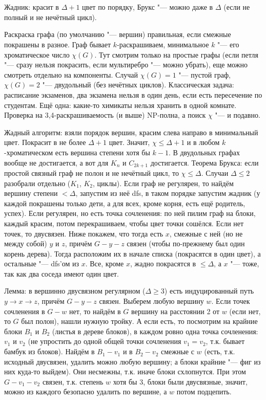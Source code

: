 \section{} %
	Жадник: красит в $\Delta+1$ цвет по порядку, Брукс "--- можно даже в $\Delta$ (если не полный и не нечётный цикл).

	Раскраска графа (по умолчанию "--- вершин) правильная, если смежные покрашены в разное.
	Граф бывает $k$-раскрашиваем, минимальное $k$ "--- его хроматическое число $\chi(G)$.
	Тут смотрим только на простые графы (если петля "--- сразу нельзя покрасить, если мультиребро "--- можно убрать),
	еще можно смотреть отдельно на компоненты.
	Случай $\chi(G)=1$ "--- пустой граф, $\chi(G)=2$ "--- двудольный (без нечётных циклов).
	Классическая задача: расписание экзаменов, два экзамена нельзя в один день, если есть пересечение по студентам.
	Ещё одна: какие-то химикаты нельзя хранить в одной комнате.
	Проверка на 3,4-раскрашиваемость (и выше) NP-полна, а поиск $\chi$ "--- и подавно.

	Жадный алгоритм: взяли порядок вершин, красим слева направо в минимальный цвет.
	Покрасит в не более $\Delta+1$ цвет.
	Значит, $\chi\le\Delta+1$ и в любом $k$-хроматическом есть вершина степени хотя бы $k-1$.
	В двудольных графах вообще не достигается, а вот для $K_n$ и $C_{2k+1}$ достигается.
	Теорема Брукса: если простой связный граф не полон и не нечётный цикл, то $\chi \le \Delta$.
	Случаи $\Delta \le 2$ разобрали отдельно ($K_1$, $K_2$, циклы).
	Если граф не регулярен, то найдём вершину степени $<\Delta$, запустим из неё dfs, в таком порядке запустим жадник
	(у каждой покрашены только дети, а для всех, кроме корня, есть ещё родитель, успех).
	Если регулярен, но есть точка сочленения: по ней пилим граф на блоки, каждый красим, потом перекрашиваем, чтобы цвет точки сошёлся.
	Если нет точек, то двусвязен.
	Ниже покажем, что тогда есть $x$, смежные с ней (но не между собой) $y$ и $z$, причём $G-y-z$ связен (чтобы по-прежнему был один корень дерева).
	Тогда расположим их в начале списка (покрасятся в один цвет), а остальные "--- dfs'ом из $x$.
	Все, кроме $x$, жадно покрасятся в $\le \Delta$, а $x$ "--- тоже, так как два соседа имеют один цвет.

	Лемма: в вершинно двусвязном регулярном ($\Delta \ge 3$) есть индуцированный путь $y \to x \to z$, причём $G-y-z$ связен.
	Выберем любую вершину $w$.
	Если точек сочленения в $G-w$ нет, то найдём в $G$ вершину на расстоянии 2 от $w$ (если нет, то $G$ был полон), нашли нужную тройку.
	А если есть, то посмотрим на крайние блоки $B_1$ и $B_2$ (листья в дереве блоков), в каждом ровно одна точка сочленения: $v_1$ и $v_2$
	(не упростить до одной общей точки сочленения $v_1=v_2$, т.к. бывает бамбук из блоков).
	Найдём в $B_1-v_1$ и в $B_2-v_2$ смежные с $w$ (есть, т.к. исходный двусвязен, удалить можно любую вершину; а блоки крайние "--- фиг из них куда-то выйдем).
	Они несмежны, т.к. иначе блоки схлопнутся.
	При этом $G-v_1-v_2$ связен, т.к. степень $w$ хотя бы 3, блоки были двусвязные, значит, можно из каждого безопасно удалить по вершине,
	а $w$ потом подцепить.

